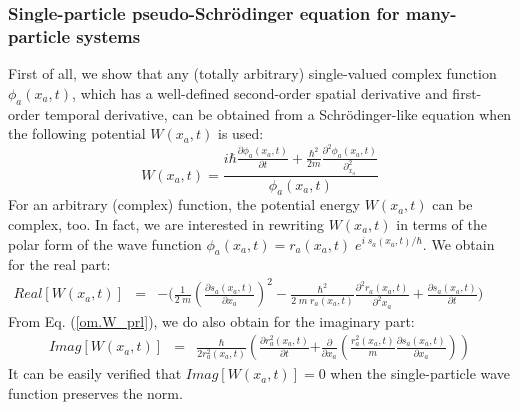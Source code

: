 \documentclass[onecolumn,nofootinbib, secnumarabic, amsmath, nobibnotes,11pt,aps,pra]{revtex4-1}
\newcommand{\eref}[1]{Eq. (\ref{#1})}
\begin{document}
\subsubsection{Single-particle pseudo-Schr\"odinger equation for many-particle systems}

First of all, we show that any (totally arbitrary) single-valued complex function $\phi_a(x_a,t)$, which has a well-defined second-order spatial derivative and first-order temporal derivative, can be obtained from a Schr\"odinger-like equation when the following potential $W(x_{a},t)$ is used:\vspace*{-6pt}
\begin{equation}
\label{om.W_prl}
W(x_{a},t) = \frac {i\hbar\frac{\partial \phi_{a}(x_{a},t)}{\partial t} + \frac{\hbar^2}{2m}\frac{\partial^2\phi_{a}(x_{a},t) }{\partial_{x_a}^2}} {\phi_{a}(x_{a},t)}
\end{equation}
For an arbitrary (complex) function, the potential energy
$W(x_{a},t)$ can be complex, too. In fact, we are interested in rewriting  $W(x_{a},t)$ in terms of the polar form of the wave
function $\phi_a(x_a,t) = r_a(x_a,t) \; e^{i \; s_a(x_a,t)/\hbar}$.
We obtain for the real part:
\begin{eqnarray}
\label{om.ReW_prl}
{Real}[W(x_{a},t)] &=& - \Bigg( \frac {1} {2 \; m} \left (\frac {\partial s_a(x_a,t)} {\partial x_a} \right)^2-\frac{\hbar^2} {2 \; m \; r_a(x_a,t)}
\frac {\partial^2 r_a(x_a,t)} {\partial^2 x_a}
 + \frac {\partial s_a(x_a,t)} {\partial t} \Bigg)\qquad
\end{eqnarray}
From \eref{om.W_prl}, we do also obtain  for the imaginary part:
\begin{eqnarray}
\label{om.ImW_prl}
\textit{Imag}[W(x_{a},t)] &=& \frac{\hbar}
{2r_a^2(x_a,t)}\!\! \left( \frac {\partial r_a^2(x_a,t)} {\partial
t}\right.\left. + \frac {\partial} {\partial x_a} \left( \frac {r_a^2(x_a,t)} {m}
\frac {\partial s_a(x_a,t)} {\partial x_a} \right) \right)
\end{eqnarray}
It can be easily verified that $\textit{Imag}[W(x_{a},t)] = 0$ when the single-particle wave function preserves the norm.
\end{document}
